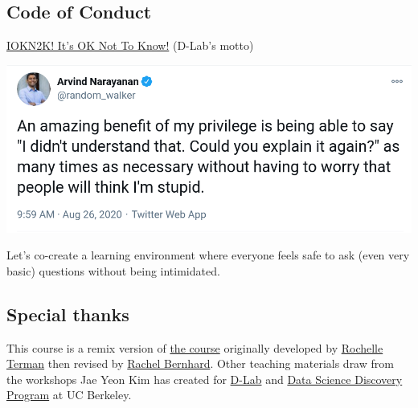 \documentclass[
]{article}
\begin{document}
\hypertarget{code-of-conduct}{%
\subsection{Code of Conduct}\label{code-of-conduct}}

\href{https://dlab.berkeley.edu/blog/what-iokn2k}{IOKN2K! It's OK Not To
Know!} (D-Lab's motto)

\includegraphics{tweet_screenshot.png}

Let's co-create a learning environment where everyone feels safe to ask
(even very basic) questions without being intimidated.

\hypertarget{special-thanks}{%
\subsection{Special thanks}\label{special-thanks}}

This course is a remix version of
\href{https://github.com/rochelleterman/PS239T}{the course} originally
developed by \href{http://rochelleterman.com/}{Rochelle Terman} then
revised by \href{http://rachelbernhard.com/}{Rachel Bernhard}. Other
teaching materials draw from the workshops Jae Yeon Kim has created for
\href{https://dlab.berkeley.edu/}{D-Lab} and
\href{https://data.berkeley.edu/research/discovery-program-home}{Data
Science Discovery Program} at UC Berkeley.
\end{document}
